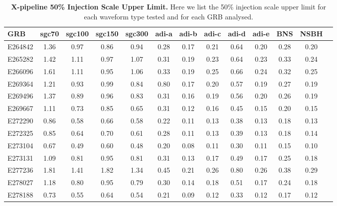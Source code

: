 \documentclass[11pt]{cuthesis}
\begin{document}
\begin{landscape}
\begin{table}[p]
\centering
\begin{tabular}{l c  c  c  c  c  c  c  c c c c c |}
\hline
GRB & sgc70 & sgc100 & sgc150 & sgc300 & adi-a & adi-b & adi-c & adi-d & adi-e & BNS & NSBH \\     
\hline                                                             
E264842 & 1.36 & 0.97 & 0.86 & 0.94 & 0.28 & 0.17 & 0.21 & 0.64 & 0.20 & 0.28 & 0.20 \\
E265282 & 1.42 & 1.11 & 0.97 & 1.07 & 0.31 & 0.19 & 0.23 & 0.64 & 0.23 & 0.33 & 0.24 \\
E266096 & 1.61 & 1.11 & 0.95 & 1.06 & 0.33 & 0.19 & 0.25 & 0.66 & 0.24 & 0.32 & 0.25 \\
E269364 & 1.21 & 0.93 & 0.99 & 0.84 & 0.80 & 0.17 & 0.20 & 0.57 & 0.19 & 0.27 & 0.19 \\
E269496 & 1.37 & 0.89 & 0.96 & 0.83 & 0.31 & 0.16 & 0.19 & 0.56 & 0.20 & 0.26 & 0.19 \\
E269667 & 1.11 & 0.73 & 0.85 & 0.65 & 0.31 & 0.12 & 0.16 & 0.45 & 0.15 & 0.20 & 0.15 \\
E272290 & 0.86 & 0.58 & 0.66 & 0.58 & 0.22 & 0.11 & 0.13 & 0.38 & 0.13 & 0.18 & 0.13 \\
E272325 & 0.85 & 0.64 & 0.70 & 0.61 & 0.28 & 0.11 & 0.13 & 0.39 & 0.13 & 0.18 & 0.14 \\
E273104 & 0.67 & 0.49 & 0.60 & 0.48 & 0.20 & 0.08 & 0.11 & 0.30 & 0.11 & 0.15 & 0.10 \\
E273131 & 1.09 & 0.81 & 0.95 & 0.81 & 0.31 & 0.13 & 0.17 & 0.49 & 0.17 & 0.25 & 0.18 \\
E277236 & 1.81 & 1.41 & 1.82 & 1.34 & 0.45 & 0.21 & 0.26 & 0.80 & 0.26 & 0.38 & 0.29 \\
E278027 & 1.18 & 0.80 & 0.95 & 0.79 & 0.30 & 0.14 & 0.18 & 0.51 & 0.17 & 0.24 & 0.18 \\
E278188 & 0.73 & 0.55 & 0.64 & 0.54 & 0.21 & 0.09 & 0.12 & 0.33 & 0.12 & 0.17 & 0.12 \\
\end{tabular}
\caption{\textbf{X-pipeline 50\% Injection Scale Upper Limit.} Here we list the 50\% injection scale upper limit for each waveform type tested and for each GRB analysed.}
\end{table}
\end{landscape}
\backmatter



\end{document}

